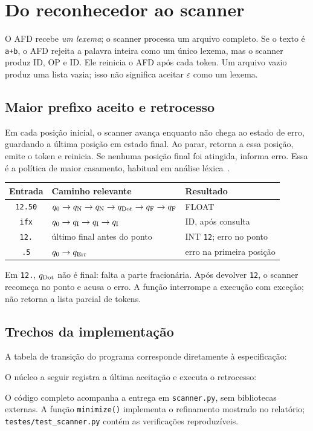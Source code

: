 \documentclass[12pt,a4paper]{article}
\begin{document}
\section{Do reconhecedor ao scanner}
O AFD recebe \emph{um lexema}; o scanner processa um arquivo completo.
Se o texto é \texttt{a+b}, o AFD rejeita a palavra inteira como um único lexema,
mas o scanner produz ID, OP e ID. Ele reinicia o AFD após cada token.
Um arquivo vazio produz uma lista vazia; isso não significa aceitar
$\varepsilon$ como um lexema.

\subsection{Maior prefixo aceito e retrocesso}
Em cada posição inicial, o scanner avança enquanto não chega ao estado de erro,
guardando a última posição em estado final. Ao parar, retorna a essa posição,
emite o token e reinicia. Se nenhuma posição final foi atingida, informa erro.
Essa é a política de maior casamento, habitual em análise léxica~\cite{aho}.

\begin{center}
\begin{tabular}{cll}
\toprule Entrada & Caminho relevante & Resultado\\\midrule
\texttt{12.50} & $q_{\mathrm{0}}\to q_{\mathrm{N}}\to q_{\mathrm{N}}\to q_{\mathrm{Dot}}\to q_{\mathrm{F}}\to q_{\mathrm{F}}$ & FLOAT\\
\texttt{ifx} & $q_{\mathrm{0}}\to q_{\mathrm{I}}\to q_{\mathrm{I}}\to q_{\mathrm{I}}$ & ID, após consulta\\
\texttt{12.} & último final antes do ponto & INT \texttt{12}; erro no ponto\\
\texttt{.5} & $q_{\mathrm{0}}\to q_{\mathrm{Err}}$ & erro na primeira posição\\\bottomrule
\end{tabular}\end{center}
Em \texttt{12.}, $q_{\mathrm{Dot}}$ não é final: falta a parte fracionária. Após devolver
\texttt{12}, o scanner recomeça no ponto e acusa o erro. A função interrompe a
execução com exceção; não retorna a lista parcial de tokens.

\clearpage
\subsection{Trechos da implementação}
A tabela de transição do programa corresponde diretamente à especificação:

O núcleo a seguir registra a última aceitação e executa o retrocesso:

O código completo acompanha a entrega em \texttt{scanner.py}, sem bibliotecas
externas. A função \texttt{minimize()} implementa o refinamento mostrado no
relatório; \texttt{testes/test\_scanner.py} contém as verificações reproduzíveis.
\end{document}

